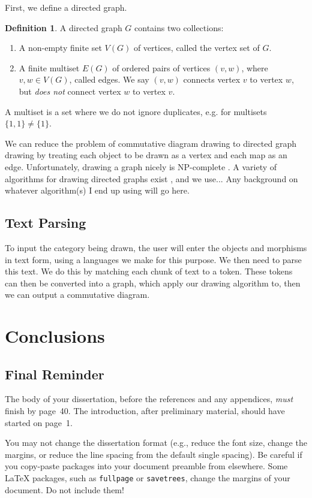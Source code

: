 \documentclass[logo,bsc,singlespacing,parskip]{infthesis}
\theoremstyle{definition}
\newtheorem{defn}[prop]{Definition}
\begin{document}
First, we define a directed graph.
\begin{defn}
    A directed graph $G$ contains two collections:
    \begin{enumerate}
        \item A non-empty finite set $V(G)$ of vertices, called the vertex set of $G$.
        \item A finite multiset $E(G)$ of ordered pairs of vertices $(v,w)$, where $v, w \in V(G)$, called edges. We say $(v,w)$ connects vertex $v$ to vertex $w$, but \emph{does not} connect vertex $w$ to vertex $v$.
    \end{enumerate}
\end{defn}
 A multiset is a set where we do not ignore duplicates, e.g. for multisets $\{1, 1\} \ne \{1\}$.

We can reduce the problem of commutative diagram drawing to directed graph drawing by treating each object to be drawn as a vertex and each map as an edge.
Unfortunately, drawing a graph nicely is NP-complete \cite{10.1007/3-540-52698-6_1}. A variety of algorithms for drawing directed graphs exist \cite{di1994algorithms}, and we use... Any background on whatever algorithm(s) I end up using will go here.


\section{Text Parsing}\label{bkg:text-parse}
To input the category being drawn, the user will enter the objects and morphisms in text form, using a languages we make for this purpose. We then need to parse this text. We do this by matching each chunk of text to a token. These tokens can then be converted into a graph, which apply our drawing algorithm to, then we can output a commutative diagram.

\chapter{Conclusions}

\section{Final Reminder}

The body of your dissertation, before the references and any appendices,
\emph{must} finish by page~40. The introduction, after preliminary material,
should have started on page~1.

You may not change the dissertation format (e.g., reduce the font size, change
the margins, or reduce the line spacing from the default single spacing). Be
careful if you copy-paste packages into your document preamble from elsewhere.
Some \LaTeX{} packages, such as \texttt{fullpage} or \texttt{savetrees}, change
the margins of your document. Do not include them!
\end{document}
